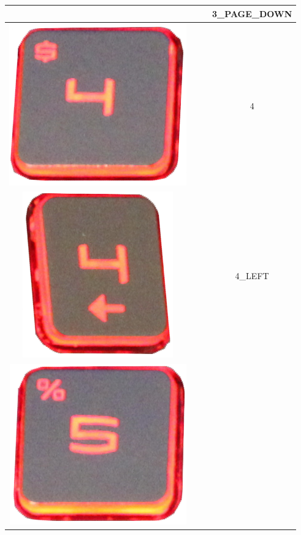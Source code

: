 \begin{longtable}{cccc}
\begin{minipage}[c]{.3\textwidth}
\vspace{0.2cm}
\end{minipage} & & & 3\_PAGE\_DOWN\\
\hline
\begin{minipage}[c]{.3\textwidth}
\vspace{0.2cm}
\includegraphics[scale=0.1]{Images/KeyMapping/4}
\vspace{0.2cm}
\end{minipage} & & & 4\\
\hline
\begin{minipage}[c]{.3\textwidth}
\vspace{0.2cm}
\includegraphics[scale=0.1]{Images/KeyMapping/4_LEFT}
\vspace{0.2cm}
\end{minipage} & & & 4\_LEFT\\
\hline
\begin{minipage}[c]{.3\textwidth}
\vspace{0.2cm}
\includegraphics[scale=0.1]{Images/KeyMapping/5}

\end{minipage}
\end{longtable}
